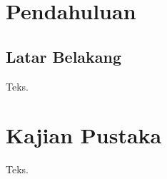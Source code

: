 \documentclass[12pt,a4paper,onecolumn,oneside,final]{report}
\begin{document}
\tableofcontents
\clearpage
{}
\chapter{Pendahuluan}
\section{Latar Belakang}
Teks.
\chapter{Kajian Pustaka}
Teks.
\end{document}
